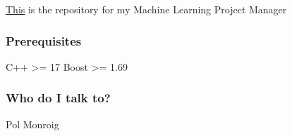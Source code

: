 \mbox{\hyperlink{namespaceThis}{This}} is the repository for my Machine Learning Project Manager

\subsubsection*{Prerequisites}

\begin{DoxyVerb}C++ >= 17
Boost >= 1.69
\end{DoxyVerb}


\subsubsection*{Who do I talk to?}

Pol Monroig 